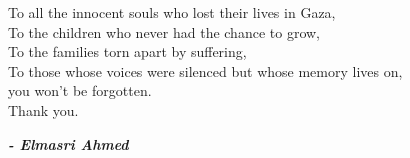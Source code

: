 
\begin{fquote}
	\begin{center}
		\large{
			To all the innocent souls who lost their lives in Gaza, \\
			To the children who never had the chance to grow, \\
			To the families torn apart by suffering, \\
			To those whose voices were silenced but whose memory lives on, \\[12pt]
			you won't be forgotten.\\[12pt]
			Thank you.
		}
	\end{center}
	\bigskip
	\medskip
\end{fquote}

\begin{adjustwidth}{2cm}{1cm}
	\hspace*{\fill} \textbf{\textit{\large{- Elmasri Ahmed}}}
\end{adjustwidth}

\clearpage
